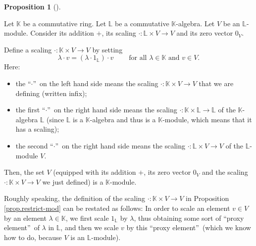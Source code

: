 \documentclass[numbers=enddot,12pt,final,onecolumn,notitlepage]{scrartcl}%
\theoremstyle{definition}
\newtheorem{prop}[theo]{Proposition}
\newenvironment{proposition}[1][]
{\begin{prop}[#1]\begin{leftbar}}
{\end{leftbar}\end{prop}}
\begin{document}
\begin{proposition}
\label{prop.restrict-mod}Let $\mathbb{K}$ be a commutative ring. Let
$\mathbb{L}$ be a commutative $\mathbb{K}$-algebra. Let $V$ be an $\mathbb{L}%
$-module. Consider its addition $+$, its scaling $\cdot:\mathbb{L}\times
V\rightarrow V$ and its zero vector $0_{V}$.

Define a scaling $\cdot:\mathbb{K}\times V\rightarrow V$ by setting%
\begin{equation}
\lambda\cdot v=\left(  \lambda\cdot1_{\mathbb{L}}\right)  \cdot
v\ \ \ \ \ \ \ \ \ \ \text{for all }\lambda\in\mathbb{K}\text{ and }v\in V.
\label{eq.prop.restrict-mod.fml}%
\end{equation}
Here:

\begin{itemize}
\item the \textquotedblleft$\cdot$\textquotedblright\ on the left hand side
means the scaling $\cdot:\mathbb{K}\times V\rightarrow V$ that we are defining
(written infix);

\item the first \textquotedblleft$\cdot$\textquotedblright\ on the right hand
side means the scaling $\cdot:\mathbb{K}\times\mathbb{L}\rightarrow\mathbb{L}$
of the $\mathbb{K}$-algebra $\mathbb{L}$ (since $\mathbb{L}$ is a $\mathbb{K}%
$-algebra and thus is a $\mathbb{K}$-module, which means that it has a scaling);

\item the second \textquotedblleft$\cdot$\textquotedblright\ on the right hand
side means the scaling $\cdot:\mathbb{L}\times V\rightarrow V$ of the
$\mathbb{L}$-module $V$.
\end{itemize}

Then, the set $V$ (equipped with its addition $+$, its zero vector $0_{V}$ and
the scaling $\cdot:\mathbb{K}\times V\rightarrow V$ we just defined) is a
$\mathbb{K}$-module.
\end{proposition}

Roughly speaking, the definition of the scaling $\cdot:\mathbb{K}\times
V\rightarrow V$ in Proposition \ref{prop.restrict-mod} can be restated as
follows: In order to scale an element $v\in V$ by an element $\lambda
\in\mathbb{K}$, we first scale $1_{\mathbb{L}}$ by $\lambda$, thus obtaining
some sort of \textquotedblleft proxy element\textquotedblright\ of $\lambda$
in $\mathbb{L}$, and then we scale $v$ by this \textquotedblleft proxy
element\textquotedblright\ (which we know how to do, because $V$ is an
$\mathbb{L}$-module).
\end{document}
